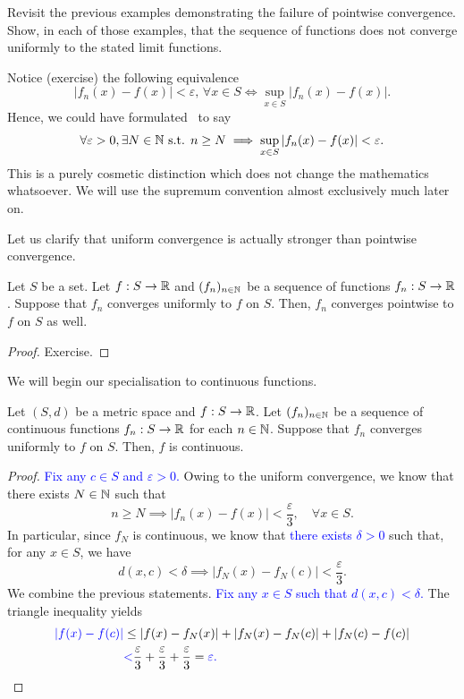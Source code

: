 \begin{ex}
	Revisit the previous examples demonstrating the failure of pointwise convergence. Show, in each of those examples, that the sequence of functions does not converge uniformly to the stated limit functions.
\end{ex}
\begin{rem}
	\label{rem:sup_unif_cvg}
	Notice (exercise) the following equivalence
	\[
	|f_n(x) - f(x)|<\varepsilon,\,\forall x \in S \iff \sup_{x\in S}|f_n(x) - f(x)|.
	\]
	Hence, we could have formulated~ to say
	\[
	\forall \varepsilon>0,\exists N\in \mathbb{N}\text{ s.t. }n\ge N\implies \sup_{x\in S}|f_n(x) - f(x)|<\varepsilon.
	\]
	This is a purely cosmetic distinction which does not change the mathematics whatsoever. We will use the supremum convention almost exclusively much later on.
\end{rem}
Let us clarify that uniform convergence is actually stronger than pointwise convergence.
\begin{lemma}
	Let $S$ be a set. Let $f:S\to \mathbb{R}$ and $(f_n)_{n\in\mathbb{N}}$ be a sequence of functions $f_n:S\to \mathbb{R}$. Suppose that $f_n$ converges uniformly to $f$ on $S$. Then, $f_n$ converges pointwise to $f$ on $S$ as well.
\end{lemma}
\begin{proof}
	Exercise.
\end{proof}
We will begin our specialisation to continuous functions.
\begin{prop}
	\label{prop:unif_cvg_cts}
	Let $(S,d)$ be a metric space and $f:S\to \mathbb{R}$. Let $(f_n)_{n\in\mathbb{N}}$ be a sequence of continuous functions $f_n:S\to \mathbb{R}$ for each $n\in\mathbb{N}$. Suppose that $f_n$ converges uniformly to $f$ on $S$. Then, $f$ is continuous.
\end{prop}
\begin{proof}
	\textcolor{blue}{Fix any $c \in S$ and $\varepsilon>0$.} Owing to the uniform convergence, we know that there exists $N\in \mathbb{N}$ such that
	\[
	n\ge N\implies |f_n(x) - f(x)|<\frac{\varepsilon}{3},\quad \forall x \in S.
	\]
	In particular, since $f_N$ is continuous, we know that \textcolor{blue}{there exists $\delta>0$} such that, for any $x \in S$, we have
	\[
	d(x,c)<\delta\implies |f_N(x) - f_N(c)|<\frac{\varepsilon}{3}.
	\]
	We combine the previous statements. \textcolor{blue}{Fix any $x\in S$ such that $d(x,c)<\delta$.} The triangle inequality yields
	\begin{align*}
		\textcolor{blue}{|f(x)-f(c)|}&\le |f(x) - f_N(x)| + |f_N(x) - f_N(c)| + |f_N(c) - f(c)| 	\\
		&\textcolor{blue}{<} \frac{\varepsilon}{3}+\frac{\varepsilon}{3}+\frac{\varepsilon}{3} = \textcolor{blue}{\varepsilon.}
	\end{align*}
\end{proof}
